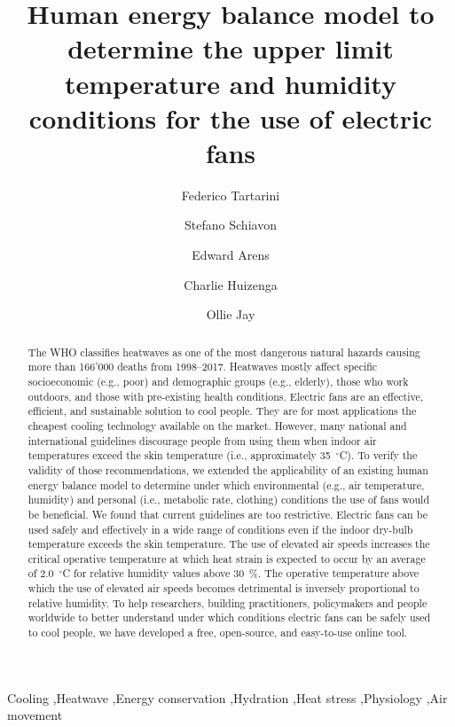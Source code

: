 
\begin{frontmatter}

\title{Human energy balance model to determine the upper limit temperature and humidity conditions for the use of electric fans}

\author[sinBerBest]{Federico Tartarini}
\author[CBE]{Stefano Schiavon}
\author[CBE]{Edward Arens}
\author[CBE]{Charlie Huizenga}
 \author[USYD]{Ollie Jay}

\address[sinBerBest]{SinBerBEST, Berkeley Education Alliance for Research in Singapore, Singapore}
\address[CBE]{Center for the Built Environment, University of California, Berkeley, USA}
 \address[USYD]{Sydney School of Health Sciences, Faculty of Medicine and Health, The University of Sydney, Sydney, Australia}

\begin{abstract}
    The WHO classifies heatwaves as one of the most dangerous natural hazards causing more than 166'000 deaths from 1998--2017.
    Heatwaves mostly affect specific socioeconomic (e.g., poor) and demographic groups (e.g., elderly), those who work outdoors, and those with pre-existing health conditions.
    Electric fans are an effective, efficient, and sustainable solution to cool people.
    They are for most applications the cheapest cooling technology available on the market.
    However, many national and international guidelines discourage people from using them when indoor air temperatures exceed the skin temperature (i.e., approximately 35~$^{\circ}$C\@).
    To verify the validity of those recommendations, we extended the applicability of an existing human energy balance model to determine under which environmental (e.g., air temperature, humidity) and personal (i.e., metabolic rate, clothing) conditions the use of fans would be beneficial.
    We found that current guidelines are too restrictive.
    Electric fans can be used safely and effectively in a wide range of conditions even if the indoor dry-bulb temperature exceeds the skin temperature.
    The use of elevated air speeds increases the critical operative temperature at which heat strain is expected to occur by an average of 2.0~$^{\circ}$C for relative humidity values above 30~\%\@.
    The operative temperature above which the use of elevated air speeds becomes detrimental is inversely proportional to relative humidity.
    To help researchers, building practitioners, policymakers and people worldwide to better understand under which conditions electric fans can be safely used to cool people, we have developed a free, open-source, and easy-to-use online tool.
\end{abstract}

\begin{keyword}
Cooling \sep Heatwave \sep Energy conservation \sep Hydration \sep Heat stress \sep Physiology \sep Air movement
\end{keyword}

\end{frontmatter}
